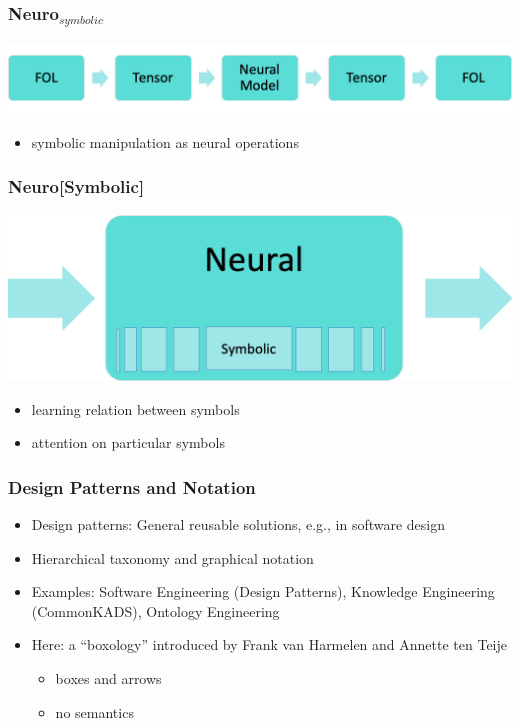 \documentclass{beamer}
\begin{document}
\begin{frame}
  \frametitle{Neuro$_{symbolic}$}
  \centering
  \includegraphics[width=.7\textwidth]{ns14.png}
  \begin{itemize}
  \item symbolic manipulation as neural operations
  \end{itemize}
\end{frame}

\begin{frame}
  \frametitle{Neuro[Symbolic]}
  \centering
  \includegraphics[width=.7\textwidth]{ns15.png}
  \begin{itemize}
  \item learning relation between symbols
  \item attention on particular symbols
  \end{itemize}
\end{frame}

\begin{frame}
\frametitle{Design Patterns and Notation}
\begin{itemize}
\item Design patterns: General reusable solutions, e.g., in software
  design
\item Hierarchical taxonomy and graphical notation
\item Examples: Software Engineering (Design Patterns), Knowledge
  Engineering (CommonKADS), Ontology Engineering
\item Here: a ``boxology'' introduced by Frank van Harmelen and
  Annette ten Teije
  \begin{itemize}
  \item boxes and arrows
  \item no semantics
  \end{itemize}
\end{itemize}
\end{frame}
\end{document}
